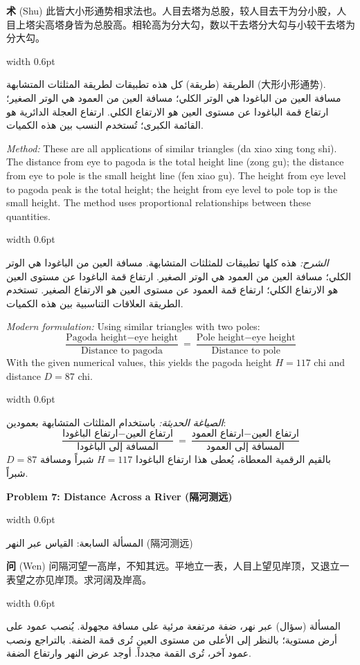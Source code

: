 \documentclass[11pt,a4paper]{article}
\newlength{\cnwidth}
\newlength{\arwidth}
\newcommand{\paralleltext}[2]{%
  \par\medskip\noindent
  \begin{minipage}[t]{\cnwidth}%
    \small #1%
  \end{minipage}%
  \hfill\textcolor{colrule}{\vrule width 0.6pt}\hfill
  \begin{minipage}[t]{\arwidth}%
    \small\arabicfont\beginR #2\endR%
  \end{minipage}%
  \par\medskip
}
\newcommand{\parallelsubsection}[2]{%
  \par\medskip\noindent
  \begin{minipage}[t]{\cnwidth}%
    \large\bfseries\color{sectioncolor} #1%
  \end{minipage}%
  \hfill\textcolor{colrule}{\vrule width 0.6pt}\hfill
  \begin{minipage}[t]{\arwidth}%
    \large\arabicfontbf\color{sectioncolor}\beginR #2\endR%
  \end{minipage}%
  \par\smallskip
}
\newcommand{\cnlabel}[1]{\textbf{\color{notecolor}#1}}
\newcommand{\arlabel}[1]{\arabicfontbf\color{notecolor}\beginR #1\endR}
\begin{document}
\paralleltext{%
\cnlabel{术} (Shu) 此皆大小形通势相求法也。人目去塔为总股，较人目去干为分小股，人目上塔尖高塔身皆为总股高。相轮高为分大勾，数以干去塔分大勾与小较干去塔为分大勾。
}{%
\arlabel{الطريقة} (طريقة) كل هذه تطبيقات لطريقة المثلثات المتشابهة (大形小形通势). مسافة العين من الباغودا هي الوتر الكلي؛ مسافة العين من العمود هي الوتر الصغير؛ ارتفاع قمة الباغودا عن مستوى العين هو الارتفاع الكلي. ارتفاع العجلة الدائرية هو القائمة الكبرى؛ تُستخدم النسب بين هذه الكميات.
}

\paralleltext{%
\textit{Method:} These are all applications of similar triangles (da xiao xing tong shi). The distance from eye to pagoda is the total height line (zong gu); the distance from eye to pole is the small height line (fen xiao gu). The height from eye level to pagoda peak is the total height; the height from eye level to pole top is the small height. The method uses proportional relationships between these quantities.
}{%
\textit{الشرح:} هذه كلها تطبيقات للمثلثات المتشابهة. مسافة العين من الباغودا هي الوتر الكلي؛ مسافة العين من العمود هي الوتر الصغير. ارتفاع قمة الباغودا عن مستوى العين هو الارتفاع الكلي؛ ارتفاع قمة العمود عن مستوى العين هو الارتفاع الصغير. تستخدم الطريقة العلاقات التناسبية بين هذه الكميات.
}

\paralleltext{%
\textit{Modern formulation:} Using similar triangles with two poles:
\[
\frac{\text{Pagoda height} - \text{eye height}}{\text{Distance to pagoda}} = \frac{\text{Pole height} - \text{eye height}}{\text{Distance to pole}}
\]
With the given numerical values, this yields the pagoda height $H = 117$ chi and distance $D = 87$ chi.
}{%
\textit{الصياغة الحديثة:} باستخدام المثلثات المتشابهة بعمودين:
\[
\frac{\text{ارتفاع الباغودا} - \text{ارتفاع العين}}{\text{المسافة إلى الباغودا}} = \frac{\text{ارتفاع العمود} - \text{ارتفاع العين}}{\text{المسافة إلى العمود}}
\]
بالقيم الرقمية المعطاة، يُعطى هذا ارتفاع الباغودا $H = 117$ شبراً ومسافة $D = 87$ شبراً.
}

\parallelsubsection{Problem 7: Distance Across a River (隔河测远)}{المسألة السابعة: القياس عبر النهر (隔河测远)}

\paralleltext{%
\cnlabel{问} (Wen) 问隔河望一高岸，不知其远。平地立一表，人目上望见岸顶，又退立一表望之亦见岸顶。求河阔及岸高。
}{%
\arlabel{المسألة} (سؤال) عبر نهر، ضفة مرتفعة مرئية على مسافة مجهولة. يُنصب عمود على أرض مستوية؛ بالنظر إلى الأعلى من مستوى العين تُرى قمة الضفة. بالتراجع ونصب عمود آخر، تُرى القمة مجدداً. أوجد عرض النهر وارتفاع الضفة.
}
\end{document}
